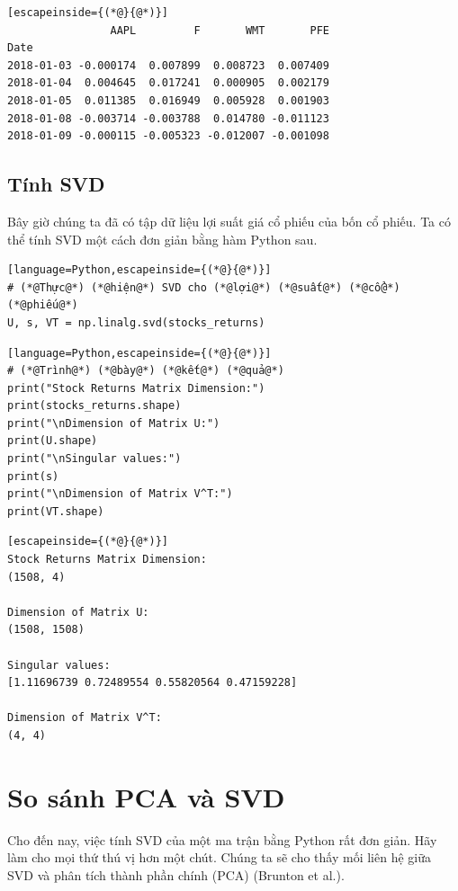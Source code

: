 \begin{lstlisting}[escapeinside={(*@}{@*)}]
                AAPL         F       WMT       PFE
Date                                              
2018-01-03 -0.000174  0.007899  0.008723  0.007409
2018-01-04  0.004645  0.017241  0.000905  0.002179
2018-01-05  0.011385  0.016949  0.005928  0.001903
2018-01-08 -0.003714 -0.003788  0.014780 -0.011123
2018-01-09 -0.000115 -0.005323 -0.012007 -0.001098
\end{lstlisting}

\subsection{Tính SVD}

Bây giờ chúng ta đã có tập dữ liệu lợi suất giá cổ phiếu của bốn cổ phiếu. Ta có thể tính SVD một cách đơn giản bằng hàm Python sau.

\begin{lstlisting}[language=Python,escapeinside={(*@}{@*)}]
# (*@Thực@*) (*@hiện@*) SVD cho (*@lợi@*) (*@suất@*) (*@cổ@*) (*@phiếu@*)
U, s, VT = np.linalg.svd(stocks_returns)
\end{lstlisting}

\begin{lstlisting}[language=Python,escapeinside={(*@}{@*)}]
# (*@Trình@*) (*@bày@*) (*@kết@*) (*@quả@*)
print("Stock Returns Matrix Dimension:")
print(stocks_returns.shape)
print("\nDimension of Matrix U:")
print(U.shape)
print("\nSingular values:")
print(s)
print("\nDimension of Matrix V^T:")
print(VT.shape)
\end{lstlisting}

\begin{lstlisting}[escapeinside={(*@}{@*)}]
Stock Returns Matrix Dimension:
(1508, 4)

Dimension of Matrix U:
(1508, 1508)

Singular values:
[1.11696739 0.72489554 0.55820564 0.47159228]

Dimension of Matrix V^T:
(4, 4)

\end{lstlisting}

\section{So sánh PCA và SVD}

Cho đến nay, việc tính SVD của một ma trận bằng Python rất đơn giản. Hãy làm cho mọi thứ thú vị hơn một chút. Chúng ta sẽ cho thấy mối liên hệ giữa SVD và phân tích thành phần chính (PCA) (Brunton et al.).

